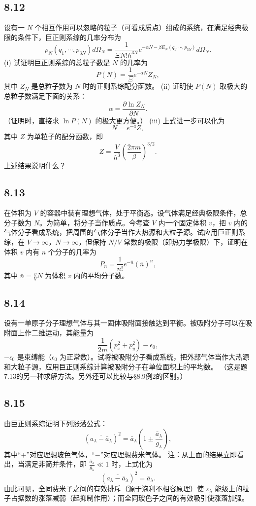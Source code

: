 \newpage
\subsection{8.12}
设有一 $N$ 个相互作用可以忽略的粒子（可看成质点）组成的系统，在满足经典极限的条件下，巨正则系综的几率分布为
$$\rho_N (q_1, \cdots , p_{3N}) d\Omega_N = \frac{1}{\Xi N! h^{3N}} e^{-\alpha N - \beta E_N (q_1, \cdots , p_{3N})} d\Omega_N.$$
(i) 试证明巨正则系综的总粒子数是 $N$ 的几率为
$$P(N) = \frac{1}{\Xi} e^{-\alpha N} Z_N,$$
其中 $Z_N$ 是总粒子数为 $N$ 时的正则系综配分函数。
(ii) 证明使 $P(N)$ 取极大的总粒子数满足下面的关系：
$$\alpha = \frac{\partial \ln Z_N}{\partial N}.$$
（证明时，直接求 $\ln P(N)$ 的极大更方便。）
(iii) 上式进一步可以化为
$$N = e^{-a} Z,$$
其中 $Z$ 为单粒子的配分函数，即
$$Z = \frac{V}{h^3} \left( \frac{2 \pi m}{\beta} \right)^{3/2}.$$
上述结果说明什么？

\newpage
\subsection{8.13}
在体积为 $V$ 的容器中装有理想气体，处于平衡态。设气体满足经典极限条件，总分子数为 $N$。为简单，将分子当作质点。今考查 $V$ 内一个固定体积 $v$，把 $v$ 内的气体分子看成系统，把周围的气体分子当作大热源和大粒子源。试应用巨正则系综，在 $V \to \infty$，$N \to \infty$，但保持 $N/V$ 常数的极限（即热力学极限）下，证明在体积 $v$ 内有 $n$ 个分子的几率为
$$P_n = \frac{1}{n!}e^{-\bar{n}}(\bar{n})^n,$$
其中 $\bar{n} = \frac{v}{V}N$ 为体积 $v$ 内的平均分子数。

\newpage
\subsection{8.14}
设有一单原子分子理想气体与其一固体吸附面接触达到平衡。被吸附分子可以在吸附面上作二维运动，其能量为
$$\frac{1}{2m} (p_x^2 + p_y^2) - \epsilon_0,$$ $-\epsilon_0$ 是束缚能（$\epsilon_0$ 为正常数）。试将被吸附分子看成系统，把外部气体当作大热源和大粒子源，应用巨正则系综计算被吸附分子在单位面积上的平均数。
（这是题7.13的另一种求解方法。另外还可以比较与§8.9例2的区别。）

\newpage
\subsection{8.15}
由巨正则系综证明下列涨落公式：
$$(\overline{a_\lambda - \bar{a}_\lambda})^2 = \bar{a}_\lambda \left( 1 \pm \frac{\bar{a}_\lambda}{g_\lambda} \right),$$
其中“$+$”对应理想玻色气体，“$-$”对应理想费米气体。
注：从上面的结果立即看出，当满足非简并条件，即 $\frac{\bar{a}_\lambda}{g_\lambda} \ll 1$ 时，上式化为
$$(\overline{a_\lambda - \bar{a}_\lambda})^2 = \bar{a}_\lambda.$$
由此可见，全同费米子之间的有效排斥（源于泡利不相容原理）使 $\varepsilon_\lambda$ 能级上的粒子占据数的涨落减弱（起抑制作用）；而全同玻色子之间的有效吸引使涨落加强。